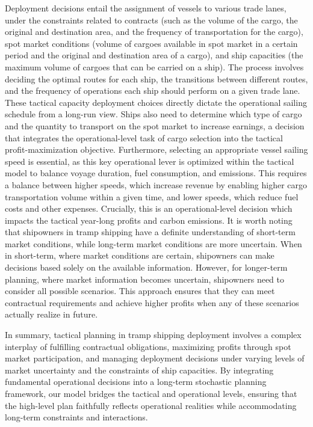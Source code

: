 \documentclass[11pt,english]{article}
\begin{document}
Deployment decisions entail the assignment of vessels to various trade lanes, under the constraints related to contracts (such as the volume of the cargo, the original and destination area, and the frequency of transportation for the cargo), spot market conditions (volume of cargoes available in spot market in a certain period and the original and destination area of a cargo), and ship capacities (the maximum volume of cargoes that can be carried on a ship). The process involves deciding the optimal routes for each ship, the transitions between different routes, and the frequency of operations each ship should perform on a given trade lane. These tactical capacity deployment choices directly dictate the operational sailing schedule from a long-run view. Ships also need to determine which type of cargo and the quantity to transport on the spot market to increase earnings, a decision that integrates the operational-level task of cargo selection into the tactical profit-maximization objective. Furthermore, selecting an appropriate vessel sailing speed is essential, as this key operational lever is optimized within the tactical model to balance voyage duration, fuel consumption, and emissions. This requires a balance between higher speeds, which increase revenue by enabling higher cargo transportation volume within a given time, and lower speeds, which reduce fuel costs and other expenses. Crucially, this is an operational-level decision which impacts the tactical year-long profits and carbon emissions. It is worth noting that shipowners in tramp shipping have a definite understanding of short-term market conditions, while long-term market conditions are more uncertain. When in short-term, where market conditions are certain, shipowners can make decisions based solely on the available information. However, for longer-term planning, where market information becomes uncertain, shipowners need to consider all possible scenarios. This approach ensures that they can meet contractual requirements and achieve higher profits when any of these scenarios actually realize in future. 

In summary, tactical planning in tramp shipping deployment involves a complex interplay of fulfilling contractual obligations, maximizing profits through spot market participation, and managing deployment decisions under varying levels of market uncertainty and the constraints of ship capacities. By integrating fundamental operational decisions into a long-term stochastic planning framework, our model bridges the tactical and operational levels, ensuring that the high-level plan faithfully reflects operational realities while accommodating long-term constraints and interactions.
\end{document}
